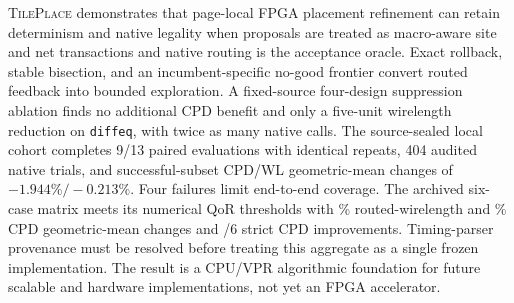 \documentclass[sigconf,anonymous,review]{acmart}
\newcommand{\system}{\textsc{TilePlace}}
\begin{document}
\system{} demonstrates that page-local FPGA placement refinement can retain
determinism and native legality when proposals are treated as macro-aware site
and net transactions and native routing is the acceptance oracle.  Exact
rollback, stable bisection, and an incumbent-specific no-good frontier convert
routed feedback into bounded exploration. A fixed-source four-design
suppression ablation finds no additional CPD benefit and only a five-unit
wirelength reduction on \texttt{diffeq}, with twice as many native calls.
The source-sealed local cohort completes 9/13 paired evaluations with identical
repeats, 404 audited native trials, and successful-subset CPD/WL geometric-mean
changes of $-1.944\%/-0.213\%$. Four failures limit end-to-end coverage.
The archived six-case matrix meets its numerical QoR thresholds with
\VFourWlGeo\% routed-wirelength and \VFourCpdGeo\% CPD geometric-mean changes
and \VFourStrict/6 strict CPD improvements.  Timing-parser provenance must
be resolved before treating this aggregate as a single frozen implementation.
The result is a CPU/VPR
algorithmic foundation for future scalable and hardware implementations, not
yet an FPGA accelerator.

\clearpage
\setlength{\bibsep}{0pt}


\end{document}
